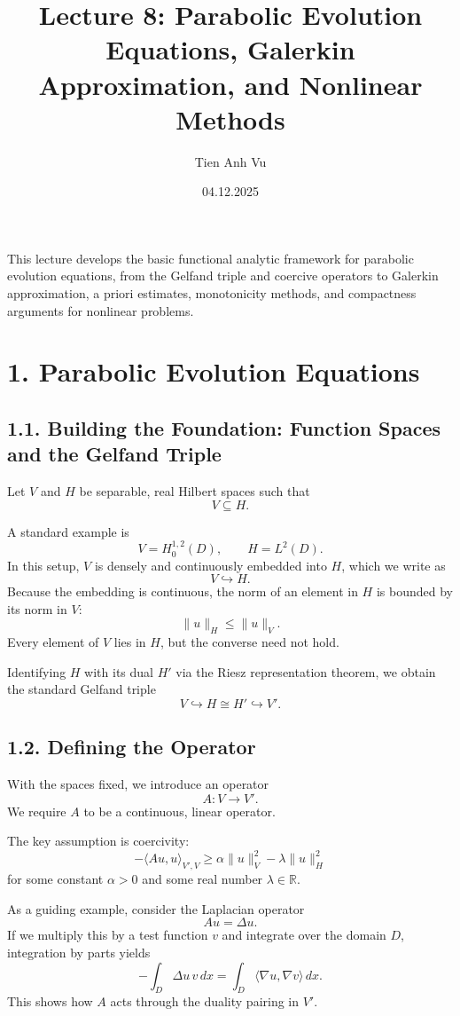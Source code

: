 \documentclass[11pt]{article}
\title{Lecture 8: Parabolic Evolution Equations, Galerkin Approximation, and Nonlinear Methods}
\date{04.12.2025}
\author{Tien Anh Vu}
\theoremstyle{definition}
\theoremstyle{remark}
\begin{document}
\maketitle

This lecture develops the basic functional analytic framework for parabolic evolution equations, from the Gelfand triple and coercive operators to Galerkin approximation, a priori estimates, monotonicity methods, and compactness arguments for nonlinear problems.

\section*{1. Parabolic Evolution Equations}

\subsection*{1.1. Building the Foundation: Function Spaces and the Gelfand Triple}
Let \(V\) and \(H\) be separable, real Hilbert spaces such that
\[
V\subseteq H.
\]

A standard example is
\[
V=H_0^{1,2}(D),
\qquad
H=L^2(D).
\]
In this setup, \(V\) is densely and continuously embedded into \(H\), which we write as
\[
V\hookrightarrow H.
\]
Because the embedding is continuous, the norm of an element in \(H\) is bounded by its norm in \(V\):
\[
\|u\|_H\le \|u\|_V.
\]
Every element of \(V\) lies in \(H\), but the converse need not hold.

Identifying \(H\) with its dual \(H'\) via the Riesz representation theorem, we obtain the standard Gelfand triple
\[
V\hookrightarrow H\cong H'\hookrightarrow V'.
\]

\subsection*{1.2. Defining the Operator}
With the spaces fixed, we introduce an operator
\[
A:V\to V'.
\]
We require \(A\) to be a continuous, linear operator.

The key assumption is coercivity:
\[
-\langle Au,u\rangle_{V',V}\ge \alpha\|u\|_V^2-\lambda\|u\|_H^2
\]
for some constant \(\alpha>0\) and some real number \(\lambda\in\mathbb R\).

As a guiding example, consider the Laplacian operator
\[
Au=\Delta u.
\]
If we multiply this by a test function \(v\) and integrate over the domain \(D\), integration by parts yields
\[
-\int_D \Delta u\,v\,dx=\int_D \langle \nabla u,\nabla v\rangle\,dx.
\]
This shows how \(A\) acts through the duality pairing in \(V'\).
\end{document}
